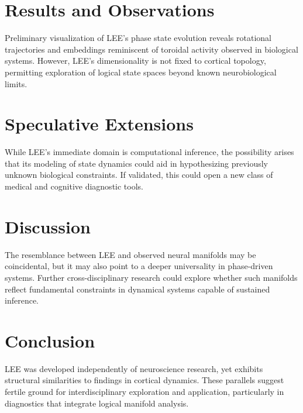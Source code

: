 \documentclass[12pt]{article}
\begin{document}
\section{Results and Observations}
Preliminary visualization of LEE’s phase state evolution reveals rotational trajectories and embeddings reminiscent of toroidal activity observed in biological systems. However, LEE’s dimensionality is not fixed to cortical topology, permitting exploration of logical state spaces beyond known neurobiological limits.

\section{Speculative Extensions}
While LEE’s immediate domain is computational inference, the possibility arises that its modeling of state dynamics could aid in hypothesizing previously unknown biological constraints. If validated, this could open a new class of medical and cognitive diagnostic tools.

\section{Discussion}
The resemblance between LEE and observed neural manifolds may be coincidental, but it may also point to a deeper universality in phase-driven systems. Further cross-disciplinary research could explore whether such manifolds reflect fundamental constraints in dynamical systems capable of sustained inference.

\section{Conclusion}
LEE was developed independently of neuroscience research, yet exhibits structural similarities to findings in cortical dynamics. These parallels suggest fertile ground for interdisciplinary exploration and application, particularly in diagnostics that integrate logical manifold analysis.



\end{document}
